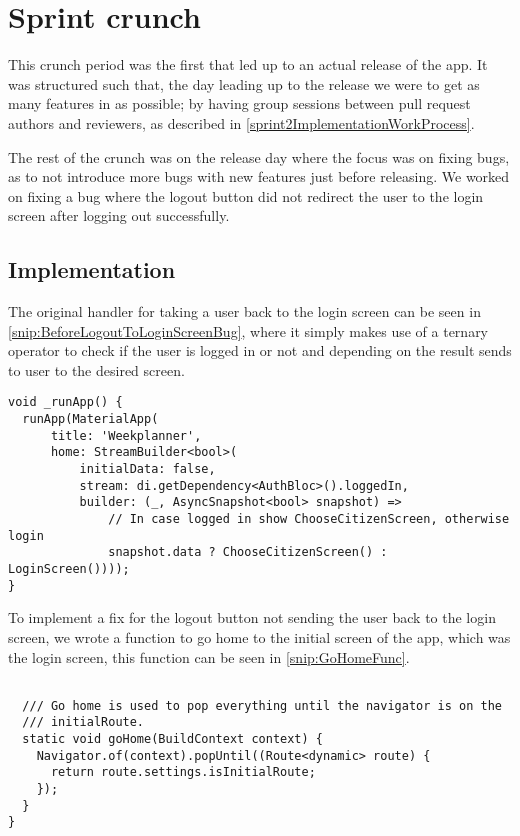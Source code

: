\section{Sprint crunch}
This crunch period was the first that led up to an actual release of the app.
It was structured such that, the day leading up to the release we were to get as many features in as possible; by having group sessions between pull request authors and reviewers, as described in \autoref{sprint2ImplementationWorkProcess}.

The rest of the crunch was on the release day where the focus was on fixing bugs, as to not introduce more bugs with new features just before releasing. 
We worked on fixing a bug where the logout button did not redirect the user to the login screen after logging out successfully.

\subsection{Implementation}
The original handler for taking a user back to the login screen can be seen in \autoref{snip:BeforeLogoutToLoginScreenBug}, where it simply makes use of a ternary operator to check if the user is logged in or not and depending on the result sends to user to the desired screen.

\begin{lstlisting}[label={snip:BeforeLogoutToLoginScreenBug}, caption={The \_runApp function before the bug fix}, captionpos=b, language=CSharp]
void _runApp() {
  runApp(MaterialApp(
      title: 'Weekplanner',
      home: StreamBuilder<bool>(
          initialData: false,
          stream: di.getDependency<AuthBloc>().loggedIn,
          builder: (_, AsyncSnapshot<bool> snapshot) =>
              // In case logged in show ChooseCitizenScreen, otherwise login
              snapshot.data ? ChooseCitizenScreen() : LoginScreen())));
}
\end{lstlisting}

To implement a fix for the logout button not sending the user back to the login screen, we wrote a function to go home to the initial screen of the app, which was the login screen, this function can be seen in \autoref{snip:GoHomeFunc}.

\begin{lstlisting}[label={snip:GoHomeFunc}, caption={The goHome function, which returns to the login screen from anywhere}, captionpos=b, language=CSharp]

  /// Go home is used to pop everything until the navigator is on the
  /// initialRoute.
  static void goHome(BuildContext context) {
    Navigator.of(context).popUntil((Route<dynamic> route) {
      return route.settings.isInitialRoute;
    });
  }
}
\end{lstlisting}

